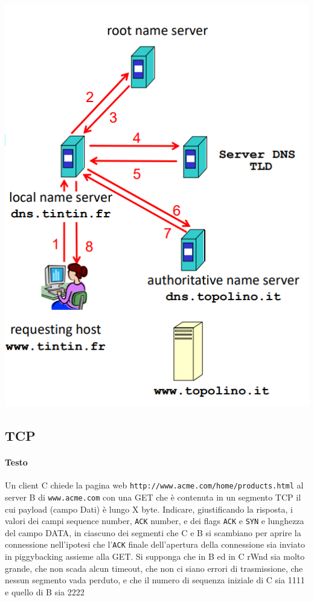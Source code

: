 \documentclass[10pt]{article}
\begin{document}
\begin{multicols}{2}
\begin{enumerate}
\begin{center}
\includegraphics[scale=0.3]{dnsqueryiterativa.png}
\end{center}
\end{enumerate}
\end{multicols}
\pagebreak
\subsection{TCP}
\paragraph{Testo} Un client C chiede la pagina web \texttt{http://www.acme.com/home/products.html} al server B di \texttt{www.acme.com} con una GET che è contenuta in un segmento TCP il cui payload (campo Dati) è lungo X byte. Indicare, giustificando la risposta, i valori dei campi sequence number, \texttt{ACK} number, e dei flags \texttt{ACK} e \texttt{SYN} e lunghezza del campo DATA, in ciascuno dei segmenti che C e B si scambiano per aprire la connessione nell’ipotesi che l’\texttt{ACK} finale dell’apertura della connessione sia inviato in piggybacking assieme alla GET. Si supponga che in B ed in C rWnd sia molto grande, che non scada alcun timeout, che non ci siano errori di trasmissione, che nessun segmento vada perduto, e che il numero di sequenza iniziale di C sia 1111 e quello di B sia 2222
\end{document}

